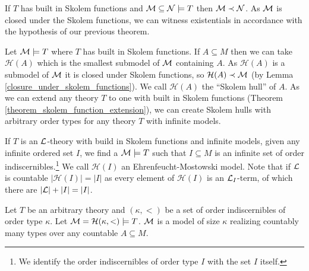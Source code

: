 \begin{lemma}\label{closure_under_skolem_functions}
If \(T\) has built in Skolem functions and \(\mathcal{M} \subseteq \mathcal{N} \models T\) then \(\mathcal{M} \prec \mathcal{N}\). 
As \(\mathcal{M}\) is closed under the Skolem functions, we can witness existentials in accordance with the hypothesis of our previous theorem. 
\end{lemma}

\begin{definition}\label{definition_skolem_hull}
Let \(\mathcal{M} \models T\) where \(T\) has built in Skolem functions. 
If \(A \subseteq M\) then we can take \(\mathcal{H}(A)\) which is the smallest submodel of \(\mathcal{M}\) containing \(A\).
As \(\mathcal{H}(A)\) is a submodel of \(\mathcal{M}\) it is closed under Skolem functions, so \(\mathcal{H}(A) \prec \mathcal{M}\) (by Lemma \ref{closure_under_skolem_functions}).
We call \(\mathcal{H}(A)\) the ``Skolem hull'' of \(A\). As we can extend any theory \(T\) to one with built in Skolem functions (Theorem \ref{theorem_skolem_function_extension}), we can create Skolem hulls with arbitrary order types for any theory \(T\) with infinite models.
\end{definition}

\begin{definition}\label{definition_ehrenfeuct_mostowski_model}
If \(T\) is an \(\mathcal{L}\)-theory with build in Skolem functions and infinite models, given any infinite ordered set \(I\), we find a \(\mathcal{M} \models T\) such that \(I \subseteq M\) is an infinite set of order indiscernibles.\footnote{We identify the order indiscernibles of order type \(I\) with the set \(I\) itself.}
We call \(\mathcal{H}(I)\) an Ehrenfeucht-Mostowski model. 
Note that if \(\mathcal{L}\) is countable \(|\mathcal{H}(I)| = |I|\) as every element of \(\mathcal{H}(I)\) is an \(\mathcal{L}_{I}\)-term, of which there are \(|\mathcal{L}|+|I| = |I|\).
\end{definition}

\begin{theorem}\label{theorem_ehrenfeuct_mostowski_types}
Let \(T\) be an arbitrary theory and \((\kappa, <)\) be a set of order indiscernibles of order type \(\kappa\).
Let \(\mathcal{M} = \mathcal{H}(\kappa, <)\models T\). 
\(\mathcal{M}\) is a model of size \(\kappa\) realizing countably many types over any countable \(A \subseteq M\).
\end{theorem}

